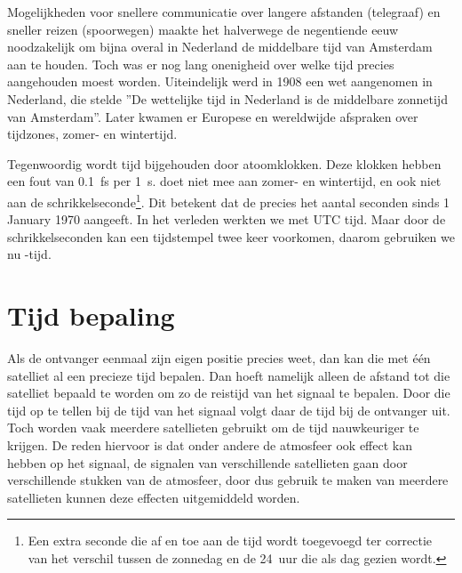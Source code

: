 Mogelijkheden voor snellere communicatie over langere afstanden
(telegraaf) en sneller reizen (spoorwegen) maakte het halverwege de
negentiende eeuw noodzakelijk om bijna overal in Nederland de middelbare
tijd van Amsterdam aan te houden. Toch was er nog lang onenigheid over
welke tijd precies aangehouden moest worden. Uiteindelijk werd in 1908
een wet aangenomen in Nederland, die stelde ''De wettelijke tijd in
Nederland is de middelbare zonnetijd van Amsterdam''. Later kwamen er
Europese en wereldwijde afspraken over tijdzones, zomer- en wintertijd.

Tegenwoordig wordt tijd bijgehouden door atoomklokken. Deze klokken
hebben een fout van \SI{0.1}{\femto\second} per \SI{1}{\second}. \gps
doet niet mee aan zomer- en wintertijd, en ook niet aan de
schrikkelseconde\footnote{Een extra seconde die af en toe aan de tijd
wordt toegevoegd ter correctie van het verschil tussen de zonnedag en de
\SI{24}{uur} die als dag gezien wordt.}. Dit betekent dat de \gps
precies het aantal seconden sinds 1 January 1970 aangeeft. In het
verleden werkten we met UTC tijd. Maar door de schrikkelseconden kan een
tijdstempel twee keer voorkomen, daarom gebruiken we nu \gps-tijd.


\section{Tijd bepaling}

Als de ontvanger eenmaal zijn eigen positie precies weet, dan kan die
met één satelliet al een precieze tijd bepalen. Dan hoeft namelijk
alleen de afstand tot die satelliet bepaald te worden om zo de reistijd
van het signaal te bepalen. Door die tijd op te tellen bij de tijd van
het signaal volgt daar de tijd bij de ontvanger uit. Toch worden vaak
meerdere satellieten gebruikt om de tijd nauwkeuriger te krijgen. De
reden hiervoor is dat onder andere de atmosfeer ook effect kan hebben op
het signaal, de signalen van verschillende satellieten gaan door
verschillende stukken van de atmosfeer, door dus gebruik te maken van
meerdere satellieten kunnen deze effecten uitgemiddeld worden.

